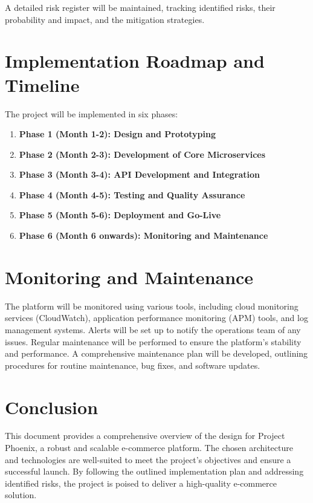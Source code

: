\documentclass[11pt,a4paper,oneside]{article}
\begin{document}
A detailed risk register will be maintained, tracking identified risks, their probability and impact, and the mitigation strategies.

\section{Implementation Roadmap and Timeline}

The project will be implemented in six phases:

\begin{enumerate}
    \item \textbf{Phase 1 (Month 1-2): Design and Prototyping}
    \item \textbf{Phase 2 (Month 2-3): Development of Core Microservices}
    \item \textbf{Phase 3 (Month 3-4): API Development and Integration}
    \item \textbf{Phase 4 (Month 4-5): Testing and Quality Assurance}
    \item \textbf{Phase 5 (Month 5-6): Deployment and Go-Live}
    \item \textbf{Phase 6 (Month 6 onwards): Monitoring and Maintenance}
\end{enumerate}

\section{Monitoring and Maintenance}

The platform will be monitored using various tools, including cloud monitoring services (CloudWatch), application performance monitoring (APM) tools, and log management systems.  Alerts will be set up to notify the operations team of any issues.  Regular maintenance will be performed to ensure the platform's stability and performance.  A comprehensive maintenance plan will be developed, outlining procedures for routine maintenance, bug fixes, and software updates.

\section{Conclusion}

This document provides a comprehensive overview of the design for Project Phoenix, a robust and scalable e-commerce platform.  The chosen architecture and technologies are well-suited to meet the project's objectives and ensure a successful launch.  By following the outlined implementation plan and addressing identified risks, the project is poised to deliver a high-quality e-commerce solution.
\end{document}
